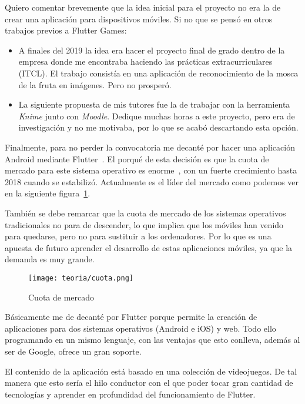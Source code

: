 
Quiero comentar brevemente que la idea inicial para el proyecto no era la de crear una aplicación para dispositivos móviles. Si no que se pensó en otros trabajos previos a Flutter Games:

\begin{itemize}
	\item A finales del 2019 la idea era hacer el proyecto final de grado dentro de la empresa donde me encontraba haciendo las prácticas extracurriculares (ITCL). El trabajo consistía en una aplicación de reconocimiento de la mosca de la fruta en imágenes. Pero no prosperó.
	
	\item La siguiente propuesta de mis tutores fue la de trabajar con la herramienta \emph{Knime} junto con \emph{Moodle}. Dedique muchas horas a este proyecto, pero era de investigación y no me motivaba, por lo que se acabó descartando esta opción.
\end{itemize}

Finalmente, para no perder la convocatoria me decanté por hacer una aplicación Android mediante Flutter~\cite{wiki:flutter}. El porqué de esta decisión es que la cuota de mercado para este sistema operativo es enorme~\cite{wiki:marketOS}, con un fuerte crecimiento hasta 2018 cuando se estabilizó. Actualmente es el líder del mercado como podemos ver en la siguiente figura~\ref{fig:cuota}. 

También se debe remarcar que la cuota de mercado de los sistemas operativos tradicionales no para de descender, lo que implica que los móviles han venido para quedarse, pero no para sustituir a los ordenadores. Por lo que es una apuesta de futuro aprender el desarrollo de estas aplicaciones móviles, ya que la demanda es muy grande.

\begin{figure}[H]
	\centering
	\texttt{[image: teoria/cuota.png]}
	\caption{Cuota de mercado}\label{fig:cuota}
\end{figure}

Básicamente me de decanté por Flutter porque permite la creación de aplicaciones para dos sistemas operativos (Android e iOS) y web. Todo ello programando en un mismo lenguaje, con las ventajas que esto conlleva, además al ser de Google, ofrece un gran soporte.

El contenido de la aplicación está basado en una colección de  videojuegos. De tal manera que esto sería el hilo conductor con el que poder tocar gran cantidad de tecnologías y aprender en profundidad del funcionamiento de Flutter.

